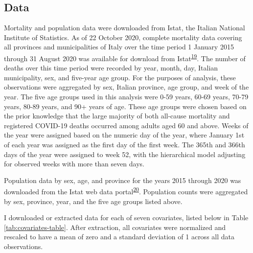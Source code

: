 \documentclass[
]{article}
\begin{document}
\hypertarget{data}{%
\subsection{Data}\label{data}}

Mortality and population data were downloaded from Istat, the Italian National Institute of Statistics. As of 22 October 2020, complete mortality data covering all provinces and municipalities of Italy over the time period 1 January 2015 through 31 August 2020 was available for download from Istat\textsuperscript{\protect\hyperlink{ref-ItalianNationalInstituteofStatisticsIstat2020a}{19}}⁠. The number of deaths over this time period were recorded by year, month, day, Italian municipality, sex, and five-year age group. For the purposes of analysis, these observations were aggregated by sex, Italian province, age group, and week of the year. The five age groups used in this analysis were 0-59 years, 60-69 years, 70-79 years, 80-89 years, and 90+ years of age. These age groups were chosen based on the prior knowledge that the large majority of both all-cause mortality and registered COVID-19 deaths occurred among adults aged 60 and above. Weeks of the year were assigned based on the numeric day of the year, where January 1st of each year was assigned as the first day of the first week. The 365th and 366th days of the year were assigned to week 52, with the hierarchical model adjusting for observed weeks with more than seven days.

Population data by sex, age, and province for the years 2015 through 2020 was downloaded from the Istat web data portal\textsuperscript{\protect\hyperlink{ref-ItalianNationalInstituteofStatisticsIstat2020}{20}}⁠. Population counts were aggregated by sex, province, year, and the five age groups listed above.

I downloaded or extracted data for each of seven covariates, listed below in Table \ref{tab:covariates-table}. After extraction, all covariates were normalized and rescaled to have a mean of zero and a standard deviation of 1 across all data observations.
\end{document}
